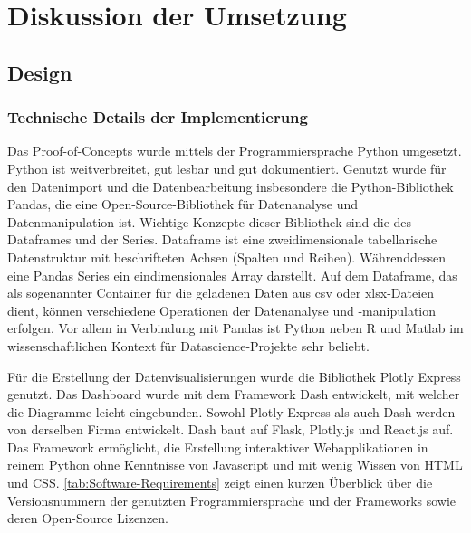 \chapter{Diskussion der Umsetzung}
\label{chap:five}
\section{Design}
    \subsection{Technische Details der Implementierung}
    Das Proof-of-Concepts wurde mittels der Programmiersprache Python umgesetzt. 
    Python ist weitverbreitet, gut lesbar und gut dokumentiert. Genutzt wurde für den Datenimport und die Datenbearbeitung insbesondere die Python-Bibliothek 
    Pandas, die eine Open-Source-Bibliothek für Datenanalyse und Datenmanipulation ist. Wichtige Konzepte dieser Bibliothek sind die des Dataframes und der Series. 
    Dataframe ist eine zweidimensionale tabellarische Datenstruktur mit beschrifteten Achsen (Spalten und Reihen).
    Währenddessen eine Pandas Series ein eindimensionales Array darstellt. Auf dem Dataframe, das als sogenannter Container für
    die geladenen Daten aus csv oder xlsx-Dateien dient, können verschiedene Operationen der Datenanalyse und -manipulation erfolgen.
    Vor allem in Verbindung mit Pandas ist Python neben R und Matlab im wissenschaftlichen Kontext für Datascience-Projekte sehr beliebt.

    
    Für die Erstellung der Datenvisualisierungen wurde die Bibliothek Plotly Express genutzt. 
    Das Dashboard wurde mit dem Framework Dash entwickelt, mit welcher die Diagramme leicht eingebunden. 
    Sowohl Plotly Express als auch Dash werden von derselben Firma entwickelt. Dash baut
    auf Flask, Plotly.js und React.js auf. Das Framework ermöglicht, die Erstellung interaktiver Webapplikationen 
    in reinem Python ohne Kenntnisse von Javascript und mit wenig Wissen von HTML und CSS. \autoref{tab:Software-Requirements} zeigt einen 
    kurzen Überblick über die Versionsnummern der genutzten Programmiersprache und der Frameworks sowie deren Open-Source
    Lizenzen.
    
